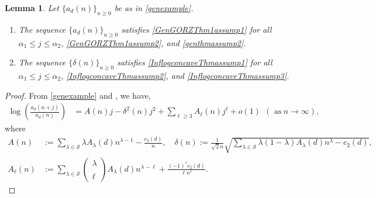 \documentclass[11pt,reqno,a4paper]{amsart}
\renewcommand{\a}{\alpha}
\renewcommand{\d}{{\delta}}
\renewcommand{\l}{\lambda}
\renewcommand{\(}{\left\(}
\renewcommand{\)}{\right\)}
\numberwithin{equation}{section}
\theoremstyle{plain}
\newtheorem{lemma}[theorem]{Lemma}
\theoremstyle{definition} %
\numberwithin{equation}{section}
\newcommand{\kbf}{\bf\color{green!40!black!60!}}
\renewcommand{\binom}[2]{\left(\begin{smallmatrix}#1\\\\#2\end{smallmatrix}\right)}
\begin{document}
\begin{lemma}\label{fact2}
Let $\{a_d(n)\}_{n\ge 0}$ be as in \eqref{genexample}. 
\begin{enumerate}
	\item \label{fact2part1} The sequence $\{a_d(n)\}_{n\ge 0}$ satisfies {\rm{\ref{GenGORZThm1assump1}}} for all $\a_1\le j\le \a_2$, {\rm{\ref{GenGORZThm1assump2}}}, and {\rm{\ref{genthmassump2}}}.
	\item \label{fact2part2} The sequence $\{\d(n)\}_{n\ge 0}$ satisfies {\rm{\ref{InflogconcaveThmassump1}}} for all $\a_1\le j\le \a_2$, {\rm{\ref{InflogconcaveThmassump2}}}, and {\rm{\ref{InflogconcaveThmassump3}}}. 
\end{enumerate}
\end{lemma}
\begin{proof}
From \eqref{genexample} and , we have,
\begin{align}\label{neweqn9}
\log\left(\frac{a_d(n+j)}{a_d(n)}\right)
&=A(n)j-\d^2(n)j^2+\sum_{\ell\ge 3}A_{\ell}(n)j^\ell+o(1)\ \ \left(\text{ as}\ n\to \infty\right),
\end{align}
where 
\begin{align*}
A(n)&:=\sum_{\l\in \mathcal{S}}\l A_{\l}(d)n^{\l-1}-\frac{c_2(d)}{n},\quad \d(n):=\frac1{\sqrt2n}\sqrt{\sum_{\l\in \mathcal{S}}\l(1-\l) A_{\l}(d)n^{\l}-c_2(d)},\\
A_{\ell}(n)&:=\sum_{\l\in \mathcal{S}}\binom{\l}{\ell}A_{\l}(d)n^{\l-\ell}+\frac{(-1)^\ell c_2(d)}{\ell n^\ell}.
\end{align*}


\end{proof}
\end{document}
